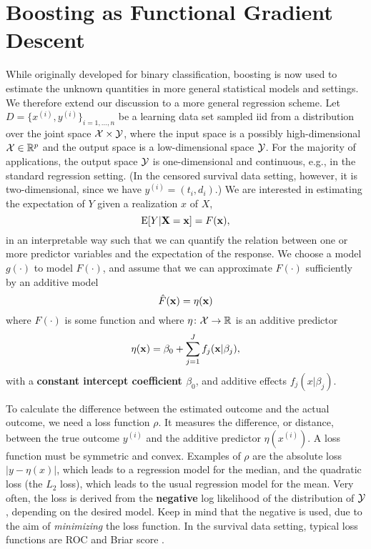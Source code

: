 \section{Boosting as Functional Gradient Descent}
While originally developed for binary classification, boosting is now used to estimate the unknown quantities in more general statistical models and settings. We therefore extend our discussion to a more general regression scheme. Let $D=\{x^{(i)},y^{(i)}\}_{i=1,\ldots,n}$ be a learning data set sampled iid from a distribution over the joint space $\mathcal{X}\times\mathcal{Y}$, where the input space is a possibly high-dimensional $\mathcal{X}\in\mathbb{R}^p$ and the output space is a low-dimensional space $\mathcal{Y}$. For the majority of applications, the output space $\mathcal{Y}$ is one-dimensional and continuous, e.g., in the standard regression setting. (In the censored survival data setting, however, it is two-dimensional, since we have $y^{(i)}=(t_i,d_i)$.) We are interested in estimating the expectation of $Y$ given a realization $x$ of $X$,
\begin{equation*}
    \operatorname{E}[Y|\mathbf{X}=\mathbf{x}]=F(\mathbf{x}),
\end{equation*}
in an interpretable way such that we can quantify the relation between one or more predictor variables and the expectation of the response. We choose a model $g(\cdot)$ to model $F(\cdot)$, and assume that we can approximate $F(\cdot)$ sufficiently by an additive model
\begin{equation}
    \hat{F}(\mathbf{x})=\eta(\mathbf{x})
\end{equation}
where $F(\cdot)$ is some function and where $\eta\colon\mathcal{X}\to\mathbb{R}$ is an additive predictor
\begin{equation}\label{eq:eta}
    \eta(\mathbf{x})=\beta_0+\sum_{j=1}^Jf_j(\mathbf{x}|\beta_j),
\end{equation}
with a \textbf{constant intercept coefficient $\beta_0$}, and additive effects $f_j(x|\beta_j)$.

To calculate the difference between the estimated outcome and the actual outcome, we need a loss function $\rho$. It measures the difference, or distance, between the true outcome $y^{(i)}$ and the additive predictor $\eta(x^{(i)})$. A loss function must be symmetric and convex. Examples of $\rho$ are the absolute loss $|y-\eta(x)|$, which leads to a regression model for the median, and the quadratic loss (the $L_2$ loss), which leads to the usual regression model for the mean. Very often, the loss is derived from the \textbf{negative} log likelihood of the distribution of $\mathcal{Y}$, depending on the desired model. Keep in mind that the negative is used, due to the aim of \textit{minimizing} the loss function. In the survival data setting, typical loss functions are ROC and Briar score \citep{bovelstadborgan}.

